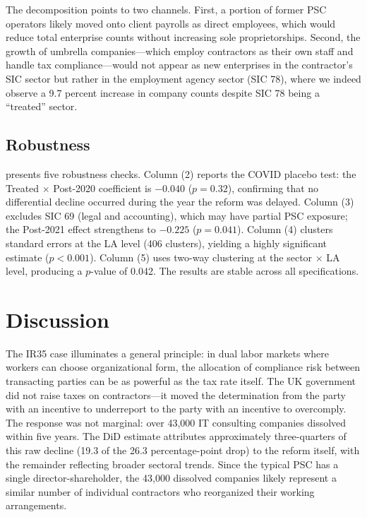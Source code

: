 \documentclass[12pt]{article}
\begin{document}
The decomposition points to two channels. First, a portion of former PSC operators likely moved onto client payrolls as direct employees, which would reduce total enterprise counts without increasing sole proprietorships. Second, the growth of umbrella companies---which employ contractors as their own staff and handle tax compliance---would not appear as new enterprises in the contractor's SIC sector but rather in the employment agency sector (SIC 78), where we indeed observe a 9.7 percent increase in company counts despite SIC 78 being a ``treated'' sector.



\subsection{Robustness}

 presents five robustness checks. Column (2) reports the COVID placebo test: the Treated $\times$ Post-2020 coefficient is $-0.040$ ($p = 0.32$), confirming that no differential decline occurred during the year the reform was delayed. Column (3) excludes SIC 69 (legal and accounting), which may have partial PSC exposure; the Post-2021 effect strengthens to $-0.225$ ($p = 0.041$). Column (4) clusters standard errors at the LA level (406 clusters), yielding a highly significant estimate ($p < 0.001$). Column (5) uses two-way clustering at the sector $\times$ LA level, producing a $p$-value of 0.042. The results are stable across all specifications.



\section{Discussion}

The IR35 case illuminates a general principle: in dual labor markets where workers can choose organizational form, the allocation of compliance risk between transacting parties can be as powerful as the tax rate itself. The UK government did not raise taxes on contractors---it moved the determination from the party with an incentive to underreport to the party with an incentive to overcomply. The response was not marginal: over 43,000 IT consulting companies dissolved within five years. The DiD estimate attributes approximately three-quarters of this raw decline (19.3 of the 26.3 percentage-point drop) to the reform itself, with the remainder reflecting broader sectoral trends. Since the typical PSC has a single director-shareholder, the 43,000 dissolved companies likely represent a similar number of individual contractors who reorganized their working arrangements.
\end{document}

